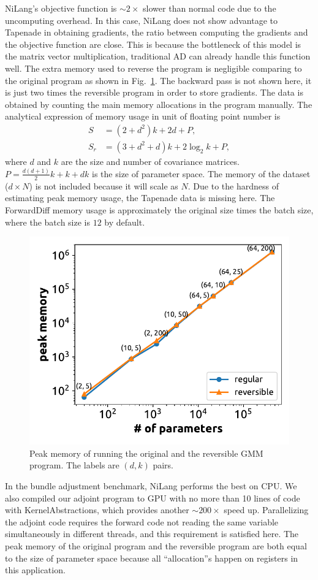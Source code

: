 \documentclass{article}
\let\oldsim\sim
\renewcommand{\sim}{{\oldsim}}
\newcommand{\<}{\langle}
\renewcommand{\>}{\rangle}
\newcommand{\Fig}[1]{Fig.~\ref{#1}}
\theoremstyle{definition}\newtheorem{definition}{\textit{Definition}}
\begin{document}
NiLang's objective function is $\sim 2\times$ slower than normal code due to the uncomputing overhead.
In this case, NiLang does not show advantage to Tapenade in obtaining gradients, the ratio between computing the gradients and the objective function are close.
This is because the bottleneck of this model is the matrix vector multiplication, traditional AD can already handle this function well.
The extra memory used to reverse the program is negligible comparing to the original program as shown in \Fig{fig:gmm-memory}.
The backward pass is not shown here, it is just two times the reversible program in order to store gradients. 
The data is obtained by counting the main memory allocations in the program manually. The analytical expression of memory usage in unit of floating point number is
\begin{align}
    S &= (2+d^2)k+2d + P, \\
    S_r &= (3+d^2+d)k+2{\log}_2k + P,
\end{align}
where $d$ and $k$ are the size and number of covariance matrices. $P = \frac{d(d+1)}{2}k + k + dk$ is the size of parameter space. The memory of the dataset ($d\times N$) is not included because it will scale as $N$.
Due to the hardness of estimating peak memory usage, the Tapenade data is missing here. The ForwardDiff memory usage is approximately the original size times the batch size, where the batch size is $12$ by default.
\begin{figure}
    \centerline{\includegraphics[width=0.55\columnwidth,trim={0 0cm 0 0},clip]{fig10.pdf}}
    \caption{Peak memory of running the original and the reversible GMM program. The labels are $(d, k)$ pairs.}\label{fig:gmm-memory}
\end{figure}

In the bundle adjustment benchmark, NiLang performs the best on CPU.
We also compiled our adjoint program to GPU with no more than 10 lines of code with KernelAbstractions, which provides another $\sim 200\times$ speed up.
Parallelizing the adjoint code requires the forward code not reading the same variable simultaneously in different threads, and this requirement is satisfied here.
The peak memory of the original program and the reversible program are both equal to the size of parameter space because all ``allocation''s happen on registers in this application.
\end{document}
